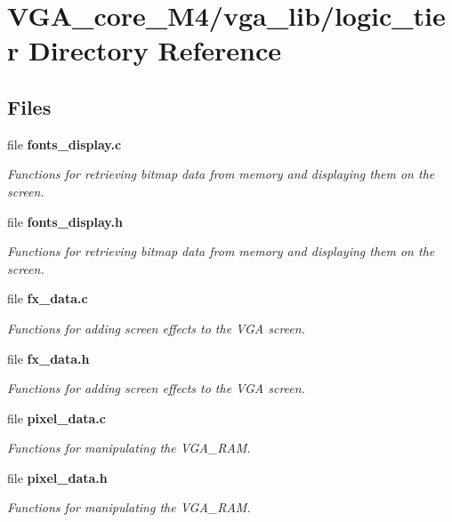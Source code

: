 \section{V\+G\+A\+\_\+core\+\_\+\+M4/vga\+\_\+lib/logic\+\_\+tier Directory Reference}
\label{dir_469e405c7c15154e6556047791a4ab3f}
\subsection*{Files}
\begin{DoxyCompactItemize}
\item 
file {\bf fonts\+\_\+display.\+c}
\begin{DoxyCompactList}\small\item\em Functions for retrieving bitmap data from memory and displaying them on the screen. \end{DoxyCompactList}\item 
file {\bf fonts\+\_\+display.\+h}
\begin{DoxyCompactList}\small\item\em Functions for retrieving bitmap data from memory and displaying them on the screen. \end{DoxyCompactList}\item 
file {\bf fx\+\_\+data.\+c}
\begin{DoxyCompactList}\small\item\em Functions for adding screen effects to the V\+GA screen. \end{DoxyCompactList}\item 
file {\bf fx\+\_\+data.\+h}
\begin{DoxyCompactList}\small\item\em Functions for adding screen effects to the V\+GA screen. \end{DoxyCompactList}\item 
file {\bf pixel\+\_\+data.\+c}
\begin{DoxyCompactList}\small\item\em Functions for manipulating the V\+G\+A\+\_\+\+R\+AM. \end{DoxyCompactList}\item 
file {\bf pixel\+\_\+data.\+h}
\begin{DoxyCompactList}\small\item\em Functions for manipulating the V\+G\+A\+\_\+\+R\+AM. \end{DoxyCompactList}\item 

\end{DoxyCompactItemize}
